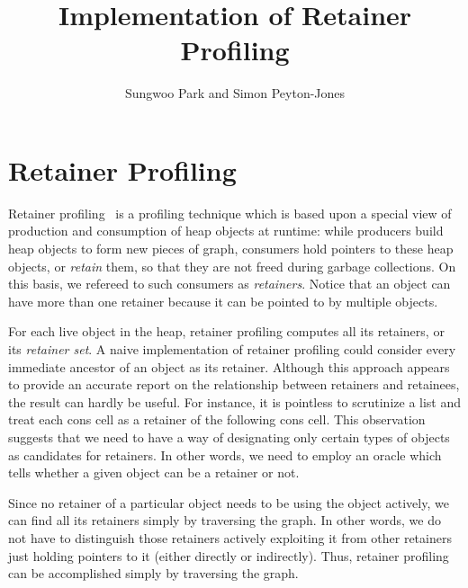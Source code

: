 \documentclass{article}
\begin{document}
\title{Implementation of Retainer Profiling}
\author{Sungwoo Park and Simon Peyton-Jones}

\makeatactive
\maketitle

\section{Retainer Profiling}

Retainer profiling~\cite{CN} is a profiling technique which is based upon a 
special view of production and consumption of heap objects at runtime:
while producers build heap objects to form new pieces of graph,
consumers hold pointers to these heap objects, or \emph{retain} them, so 
that they are not freed during garbage collections. 
On this basis, we refereed to such consumers as \emph{retainers}.
Notice that an object can have more than one retainer because it can
be pointed to by multiple objects.

For each live object in the heap, retainer profiling computes 
all its retainers, or its \emph{retainer set}.
A naive implementation of retainer profiling could consider every
immediate ancestor of an object as its retainer.
Although this approach appears to provide an accurate report on the 
relationship between retainers and retainees, the result can hardly be useful.
For instance, it is pointless to scrutinize a list and treat each cons
cell as a retainer of the following cons cell.
This observation suggests that we need to have a way of designating only 
certain types of objects as candidates for retainers.
In other words, we need to employ an oracle which tells whether a given
object can be a retainer or not.

Since no retainer of a particular object needs to be using the
object actively, we can find all its retainers simply by traversing
the graph. In other words, we do not have to distinguish those retainers
actively exploiting it from other retainers just holding pointers
to it (either directly or indirectly).
Thus, retainer profiling can be accomplished simply by traversing the
graph.
\end{document}
